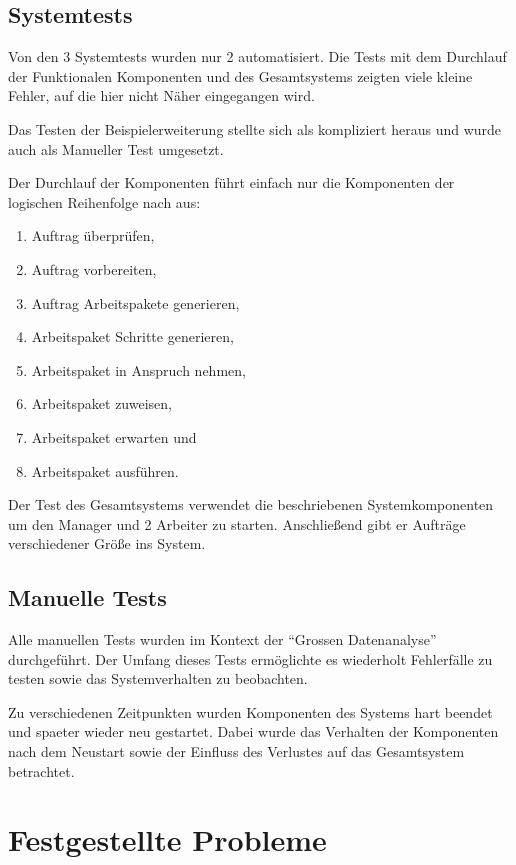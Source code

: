 \subsection{Systemtests}

Von den 3 Systemtests wurden nur 2 automatisiert.
Die Tests mit dem Durchlauf der Funktionalen Komponenten und des Gesamtsystems
zeigten viele kleine Fehler, auf die hier nicht Näher eingegangen wird.

Das Testen der Beispielerweiterung stellte sich als kompliziert heraus und wurde auch als Manueller Test umgesetzt.

Der Durchlauf der Komponenten führt einfach nur die Komponenten der logischen Reihenfolge nach aus:
\begin{enumerate}
    \item Auftrag überprüfen,
    \item Auftrag vorbereiten,
    \item Auftrag Arbeitspakete generieren,
    \item Arbeitspaket Schritte generieren,
    \item Arbeitspaket in Anspruch nehmen,
    \item Arbeitspaket zuweisen,
    \item Arbeitspaket erwarten und
    \item Arbeitspaket ausführen.
\end{enumerate}

Der Test des Gesamtsystems verwendet die beschriebenen Systemkomponenten um den Manager und 2 Arbeiter zu starten.
Anschließend gibt er Aufträge verschiedener Größe ins System.

\subsection{Manuelle Tests}

Alle manuellen Tests wurden im Kontext der ``Grossen Datenanalyse'' durchgeführt.
Der Umfang dieses Tests ermöglichte es wiederholt Fehlerfälle zu testen sowie das Systemverhalten zu beobachten.

Zu verschiedenen Zeitpunkten wurden Komponenten des Systems hart beendet und spaeter wieder neu gestartet.
Dabei wurde das Verhalten der Komponenten nach dem Neustart sowie der Einfluss des Verlustes auf das Gesamtsystem betrachtet.


\section{Festgestellte Probleme}

